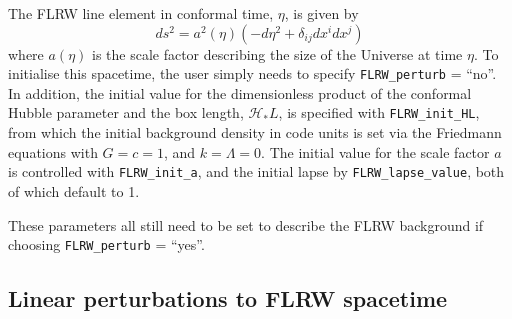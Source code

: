 The FLRW line element in conformal time, $\eta$, is given by
\begin{equation}
	ds^2 = a^2(\eta) \left( - d\eta^2 + \delta_{ij}dx^i dx^j \right)
\end{equation}
where $a(\eta)$ is the scale factor describing the size of the Universe at time $\eta$. To initialise this spacetime, the user simply needs to specify \texttt{FLRW\_perturb} = ``no''. In addition, the initial value for the dimensionless product of the conformal Hubble parameter and the box length, $\mathcal{H}_* L$, is specified with \texttt{FLRW\_init\_HL}, from which the initial background density in code units is set via the Friedmann equations with $G=c=1$, and $k=\Lambda=0$. The initial value for the scale factor $a$ is controlled with \texttt{FLRW\_init\_a}, and the initial lapse by \texttt{FLRW\_lapse\_value}, both of which default to 1. 

These parameters all still need to be set to describe the FLRW background if choosing \texttt{FLRW\_perturb} = ``yes''.

\subsection{Linear perturbations to FLRW spacetime}

